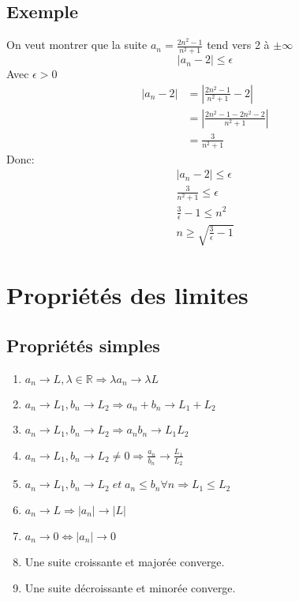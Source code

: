 \documentclass[10pt,a4paper]{book}
\newcommand{\R}{\mathbb{R}}
\begin{document}
\subsection{Exemple}
On veut montrer que la suite \(a_n = \frac{2n^2-1}{n^2+1}\) tend vers 2 à $\pm \infty$
\begin{displaymath}
\left| a_n - 2 \right| \leq \epsilon
\end{displaymath}
Avec $\epsilon > 0$
\begin{equation*}
\begin{split}
\left| a_n - 2 \right| & = \left| \frac{2n^2-1}{n^2+1} - 2 \right| \\
 & = \left| \frac{2n^2 - 1 - 2n^2 - 2}{n^2+1} \right| \\
 & = \frac{3}{n^2+1}
\end{split}
\end{equation*}
Donc:
\begin{equation*}
\begin{split}
\left| a_n - 2 \right| \leq \epsilon \\
\frac{3}{n^2+1} \leq \epsilon \\
\frac{3}{\epsilon} - 1 \leq n^2 \\
n \geq \sqrt{\frac{3}{\epsilon} - 1}
\end{split}
\end{equation*}

\section{Propriétés des limites}

\subsection{Propriétés simples}
\begin{enumerate}
\item $a_n \rightarrow L, \lambda \in \R \Rightarrow \lambda a_n \rightarrow \lambda L $
\item $a_n \rightarrow L_1, b_n \rightarrow L_2 \Rightarrow a_n + b_n \rightarrow L_1 + L_2 $
\item $a_n \rightarrow L_1, b_n \rightarrow L_2 \Rightarrow a_nb_n \rightarrow L_1L_2 $
\item $a_n \rightarrow L_1, b_n \rightarrow L_2 \neq 0 \Rightarrow \frac{a_n}{b_n} \rightarrow \frac{L_1}{L_2}$
\item $a_n \rightarrow L_1, b_n \rightarrow L_2 \; et \; a_n \leq b_n \forall n \Rightarrow L_1 \leq L_2 $
\item $a_n \rightarrow L \Rightarrow \left| a_n \right| \rightarrow \left| L \right| $
\item $a_n \rightarrow 0 \Leftrightarrow \left| a_n \right| \rightarrow 0 $
\item Une suite croissante et majorée converge. 
\item Une suite décroissante et minorée converge.
\end{enumerate}
\end{document}
